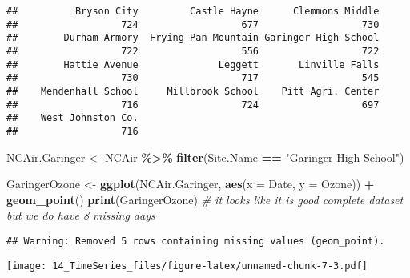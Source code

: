 \documentclass[
]{article}
\newenvironment{Shaded}{\begin{snugshade}}{\end{snugshade}}
\newcommand{\CommentTok}[1]{\textcolor[rgb]{0.56,0.35,0.01}{\textit{#1}}}
\newcommand{\DataTypeTok}[1]{\textcolor[rgb]{0.13,0.29,0.53}{#1}}
\newcommand{\KeywordTok}[1]{\textcolor[rgb]{0.13,0.29,0.53}{\textbf{#1}}}
\newcommand{\NormalTok}[1]{#1}
\newcommand{\OperatorTok}[1]{\textcolor[rgb]{0.81,0.36,0.00}{\textbf{#1}}}
\newcommand{\StringTok}[1]{\textcolor[rgb]{0.31,0.60,0.02}{#1}}
\begin{document}
\begin{verbatim}
##          Bryson City         Castle Hayne      Clemmons Middle 
##                  724                  677                  730 
##        Durham Armory  Frying Pan Mountain Garinger High School 
##                  722                  556                  722 
##        Hattie Avenue              Leggett       Linville Falls 
##                  730                  717                  545 
##    Mendenhall School     Millbrook School    Pitt Agri. Center 
##                  716                  724                  697 
##    West Johnston Co. 
##                  716
\end{verbatim}

\begin{Shaded}
\begin{Highlighting}[]
\NormalTok{NCAir.Garinger <{-}}\StringTok{ }\NormalTok{NCAir }\OperatorTok{\%>\%}
\StringTok{  }\KeywordTok{filter}\NormalTok{(Site.Name }\OperatorTok{==}\StringTok{ "Garinger High School"}\NormalTok{)}

\NormalTok{GaringerOzone <{-}}
\KeywordTok{ggplot}\NormalTok{(NCAir.Garinger, }\KeywordTok{aes}\NormalTok{(}\DataTypeTok{x =}\NormalTok{ Date, }\DataTypeTok{y =}\NormalTok{ Ozone)) }\OperatorTok{+}
\StringTok{  }\KeywordTok{geom\_point}\NormalTok{() }
\KeywordTok{print}\NormalTok{(GaringerOzone) }\CommentTok{\# it looks like it is good complete dataset but we do have 8 missing days}
\end{Highlighting}
\end{Shaded}

\begin{verbatim}
## Warning: Removed 5 rows containing missing values (geom_point).
\end{verbatim}

\texttt{[image: 14\_TimeSeries\_files/figure-latex/unnamed-chunk-7-3.pdf]}
\end{document}
